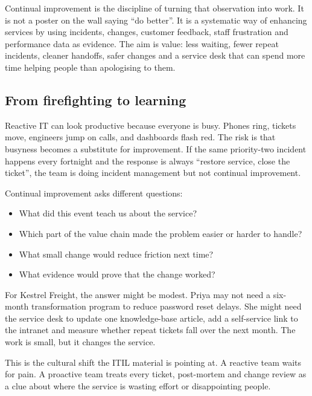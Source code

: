 Continual improvement is the discipline of turning that observation into work. It is not a poster on the wall saying ``do better''. It is a systematic way of enhancing services by using incidents, changes, customer feedback, staff frustration and performance data as evidence. The aim is value: less waiting, fewer repeat incidents, cleaner handoffs, safer changes and a service desk that can spend more time helping people than apologising to them.



\subsection{From firefighting to learning}


Reactive IT can look productive because everyone is busy. Phones ring, tickets move, engineers jump on calls, and dashboards flash red. The risk is that busyness becomes a substitute for improvement. If the same priority-two incident happens every fortnight and the response is always ``restore service, close the ticket'', the team is doing incident management but not continual improvement.


Continual improvement asks different questions:


\begin{itemize}[leftmargin=*]
\item What did this event teach us about the service?
\item Which part of the value chain made the problem easier or harder to handle?
\item What small change would reduce friction next time?
\item What evidence would prove that the change worked?
\end{itemize}

For Kestrel Freight, the answer might be modest. Priya may not need a six-month transformation program to reduce password reset delays. She might need the service desk to update one knowledge-base article, add a self-service link to the intranet and measure whether repeat tickets fall over the next month. The work is small, but it changes the service.


This is the cultural shift the ITIL material is pointing at. A reactive team waits for pain. A proactive team treats every ticket, post-mortem and change review as a clue about where the service is wasting effort or disappointing people.



